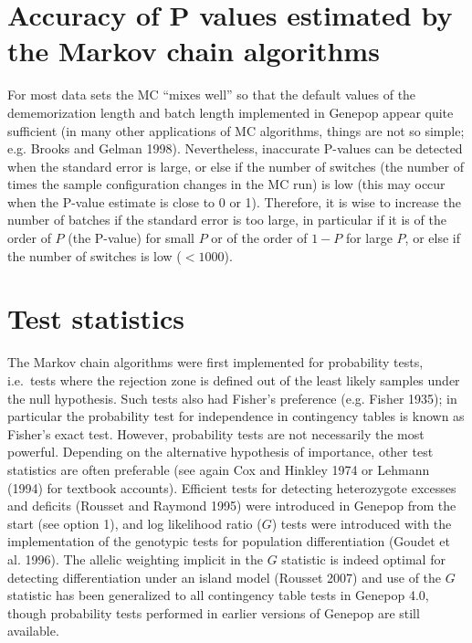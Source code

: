 \documentclass[12pt,]{book}
\begin{document}
\section{Accuracy of P values estimated by the Markov chain
algorithms}\label{accuracy-of-p-values-estimated-by-the-markov-chain-algorithms}

 For most data sets the MC
``mixes well'' so that the default values of the dememorization length
and batch length implemented in Genepop appear quite sufficient (in many
other applications of MC algorithms, things are not so simple; e.g.
Brooks and Gelman 1998). Nevertheless, inaccurate P-values can be
detected when the standard error is large, or else if the number of
switches (the number of times the sample configuration changes in the MC
run) is low (this may occur when
the P-value estimate is close to 0 or 1). Therefore, it is wise to
increase the number of batches if the standard error is too large, in
particular if it is of the order of \(P\) (the P-value) for small \(P\)
or of the order of \(1-P\) for large \(P\), or else if the number of
switches is low (\(<1000\)).

\section{Test statistics}\label{test-statistics}

The Markov chain algorithms were first implemented for probability
tests, i.e.~tests where the rejection zone is defined out of the least
likely samples under the null
hypothesis. Such tests also had
Fisher's preference (e.g. Fisher 1935); in particular the probability
test for independence in contingency tables is known as Fisher's exact
test. However, probability tests are not
necessarily the most powerful. Depending on the alternative hypothesis
of importance, other test statistics are often preferable (see again Cox
and Hinkley 1974 or Lehmann (1994) for textbook accounts). Efficient
tests for detecting heterozygote excesses and deficits (Rousset and
Raymond 1995) were introduced in Genepop from the start (see option 1),
and log likelihood ratio (\(G\)) tests were introduced with the
implementation of the genotypic tests for population differentiation
(Goudet et al. 1996). The allelic weighting implicit in the \(G\)
statistic is indeed optimal for detecting differentiation under an
island model (Rousset 2007) and use of the \(G\) statistic has been
generalized to all contingency table tests in Genepop 4.0, though
probability tests performed in earlier versions of Genepop are still
available.
\end{document}
